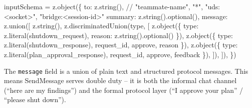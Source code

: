 \documentclass[
  english,
  11pt,
  letterpaper,
]{book}
\newenvironment{Shaded}{\begin{snugshade}}{\end{snugshade}}
\newcommand{\CommentTok}[1]{\textcolor[rgb]{0.37,0.37,0.37}{#1}}
\newcommand{\FunctionTok}[1]{\textcolor[rgb]{0.28,0.35,0.67}{#1}}
\newcommand{\NormalTok}[1]{\textcolor[rgb]{0.00,0.23,0.31}{#1}}
\newcommand{\OperatorTok}[1]{\textcolor[rgb]{0.37,0.37,0.37}{#1}}
\newcommand{\StringTok}[1]{\textcolor[rgb]{0.13,0.47,0.30}{#1}}
\begin{document}
\begin{Shaded}
\begin{Highlighting}[]
\NormalTok{inputSchema }\OperatorTok{=}\NormalTok{ z}\OperatorTok{.}\FunctionTok{object}\NormalTok{(\{}
\NormalTok{  to}\OperatorTok{:}\NormalTok{ z}\OperatorTok{.}\FunctionTok{string}\NormalTok{()}\OperatorTok{,}
  \CommentTok{// "teammate{-}name", "*", "uds:\textless{}socket\textgreater{}", "bridge:\textless{}session{-}id\textgreater{}"}
\NormalTok{  summary}\OperatorTok{:}\NormalTok{ z}\OperatorTok{.}\FunctionTok{string}\NormalTok{()}\OperatorTok{.}\FunctionTok{optional}\NormalTok{()}\OperatorTok{,}
\NormalTok{  message}\OperatorTok{:}\NormalTok{ z}\OperatorTok{.}\FunctionTok{union}\NormalTok{([}
\NormalTok{    z}\OperatorTok{.}\FunctionTok{string}\NormalTok{()}\OperatorTok{,}
\NormalTok{    z}\OperatorTok{.}\FunctionTok{discriminatedUnion}\NormalTok{(}\StringTok{\textquotesingle{}type\textquotesingle{}}\OperatorTok{,}\NormalTok{ [}
\NormalTok{      z}\OperatorTok{.}\FunctionTok{object}\NormalTok{(\{ type}\OperatorTok{:}\NormalTok{ z}\OperatorTok{.}\FunctionTok{literal}\NormalTok{(}\StringTok{\textquotesingle{}shutdown\_request\textquotesingle{}}\NormalTok{)}\OperatorTok{,}\NormalTok{ reason}\OperatorTok{:}\NormalTok{ z}\OperatorTok{.}\FunctionTok{string}\NormalTok{()}\OperatorTok{.}\FunctionTok{optional}\NormalTok{() \})}\OperatorTok{,}
\NormalTok{      z}\OperatorTok{.}\FunctionTok{object}\NormalTok{(\{ type}\OperatorTok{:}\NormalTok{ z}\OperatorTok{.}\FunctionTok{literal}\NormalTok{(}\StringTok{\textquotesingle{}shutdown\_response\textquotesingle{}}\NormalTok{)}\OperatorTok{,}\NormalTok{ request\_id}\OperatorTok{,}\NormalTok{ approve}\OperatorTok{,}\NormalTok{ reason \})}\OperatorTok{,}
\NormalTok{      z}\OperatorTok{.}\FunctionTok{object}\NormalTok{(\{ type}\OperatorTok{:}\NormalTok{ z}\OperatorTok{.}\FunctionTok{literal}\NormalTok{(}\StringTok{\textquotesingle{}plan\_approval\_response\textquotesingle{}}\NormalTok{)}\OperatorTok{,}\NormalTok{ request\_id}\OperatorTok{,}\NormalTok{ approve}\OperatorTok{,}\NormalTok{ feedback \})}\OperatorTok{,}
\NormalTok{    ])}\OperatorTok{,}
\NormalTok{  ])}\OperatorTok{,}
\NormalTok{\})}
\end{Highlighting}
\end{Shaded}

The \texttt{message} field is a union of plain text and structured
protocol messages. This means SendMessage serves double duty -- it is
both the informal chat channel (``here are my findings'') and the formal
protocol layer (``I approve your plan'' / ``please shut down'').
\end{document}
